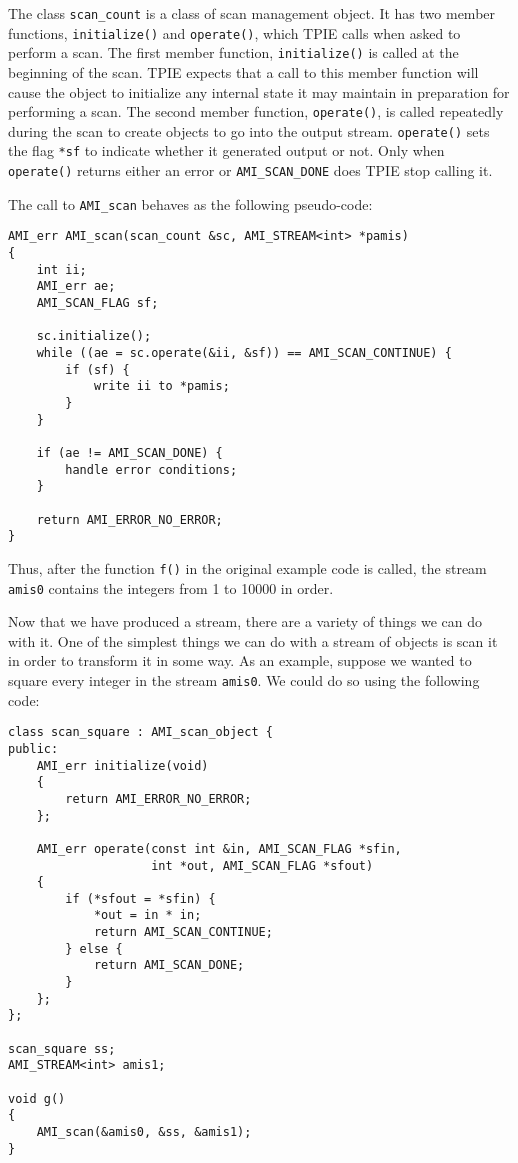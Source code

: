 The class \verb|scan_count| is a class of scan management
object.  It has two member
functions, \verb|initialize()| and \verb|operate()|, which TPIE calls
when asked to perform a scan.  The first member function,
\verb|initialize()| is called at the beginning of the scan.  TPIE
expects that a call to this member function will cause the object to
initialize any internal state it may maintain in preparation for
performing a scan.  The second member function, \verb|operate()|, is
called repeatedly during the scan to create objects to go into the
output stream.  \verb|operate()| sets the flag \verb|*sf| to indicate
whether it generated output or not.  Only when \verb|operate()|
returns either an error or \verb|AMI_SCAN_DONE| does TPIE stop calling
it.

The call to \verb|AMI_scan| behaves as the following pseudo-code:

\begin{verbatim} 
AMI_err AMI_scan(scan_count &sc, AMI_STREAM<int> *pamis)
{
    int ii;
    AMI_err ae;    
    AMI_SCAN_FLAG sf;

    sc.initialize();    
    while ((ae = sc.operate(&ii, &sf)) == AMI_SCAN_CONTINUE) {
        if (sf) {
            write ii to *pamis;
        }
    }

    if (ae != AMI_SCAN_DONE) {
        handle error conditions;
    }

    return AMI_ERROR_NO_ERROR;
}
\end{verbatim}

Thus, after the function \verb|f()| in the original example code is
called, the stream \verb|amis0| contains the integers from 1 to 10000
in order.

Now that we have produced a stream, there are a variety of things we
can do with it.  One of the simplest things we can do with a stream of
objects is scan it in order to transform it in some way.  As an
example, suppose we wanted to square every integer in the stream
\verb|amis0|.  We could do so using the following code:

\begin{verbatim}
class scan_square : AMI_scan_object {
public:
    AMI_err initialize(void)
    {
        return AMI_ERROR_NO_ERROR;
    };

    AMI_err operate(const int &in, AMI_SCAN_FLAG *sfin,
                    int *out, AMI_SCAN_FLAG *sfout)
    {
        if (*sfout = *sfin) {
            *out = in * in;
            return AMI_SCAN_CONTINUE;
        } else {
            return AMI_SCAN_DONE;
        }
    };
};

scan_square ss;
AMI_STREAM<int> amis1;    

void g() 
{
    AMI_scan(&amis0, &ss, &amis1);
}
\end{verbatim}

